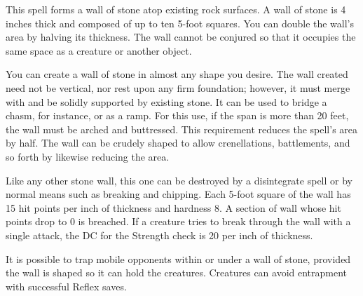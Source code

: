 \spellrng{\rngmed}
\begin{spelleffect}
  This spell forms a wall of stone atop existing rock surfaces. A wall of stone is 4 inches thick and composed of up to ten 5-foot squares. You can double the wall's area by halving its thickness. The wall cannot be conjured so that it occupies the same space as a creature or another object.
  \par You can create a wall of stone in almost any shape you desire. The wall created need not be vertical, nor rest upon any firm foundation; however, it must merge with and be solidly supported by existing stone. It can be used to bridge a chasm, for instance, or as a ramp. For this use, if the span is more than 20 feet, the wall must be arched and buttressed. This requirement reduces the spell's area by half. The wall can be crudely shaped to allow crenellations, battlements, and so forth by likewise reducing the area.
  \par Like any other stone wall, this one can be destroyed by a disintegrate spell or by normal means such as breaking and chipping. Each 5-foot square of the wall has 15 hit points per inch of thickness and hardness 8. A section of wall whose hit points drop to 0 is breached. If a creature tries to break through the wall with a single attack, the DC for the Strength check is 20  per inch of thickness.
  \par It is possible to trap mobile opponents within or under a wall of stone, provided the wall is shaped so it can hold the creatures. Creatures can avoid entrapment with successful Reflex saves.
\end{spelleffect}

